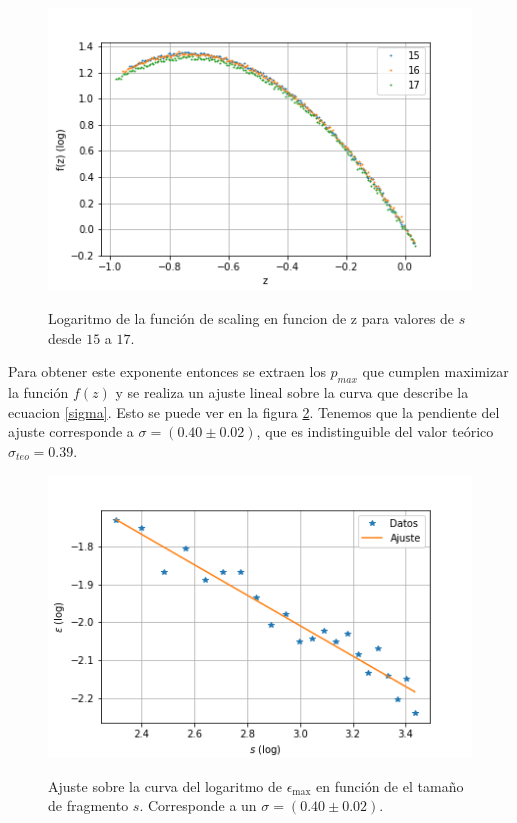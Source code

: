 \documentclass[
 reprint,
 amsmath,amssymb,
 aps,
]{revtex4-1}
\begin{document}
\begin{figure}[ht]
\begin{center}
\includegraphics[scale=0.62]{../images/f_vs_z.png} \\
\caption{Logaritmo de la funci\'on de scaling en funcion de z para valores de $s$ desde $15$ a $17$.}\label{f_vs_z}
\end{center}
\end{figure}

Para obtener este exponente entonces se extraen los $p_{max}$ que cumplen maximizar la funci\'on $f(z)$ y se realiza un ajuste lineal sobre la curva que describe la ecuacion \ref{sigma}. Esto se puede ver en la figura \ref{eps_vs_s_ajuste}. Tenemos que la pendiente del ajuste corresponde a $\sigma = (0.40 \pm 0.02)$, que es indistinguible del valor te\'orico $\sigma_{teo} = 0.39$.

\begin{figure}[ht]
\begin{center}
\includegraphics[scale=0.62]{../images/eps_vs_s_ajuste.png} \\
\caption{Ajuste sobre la curva del logaritmo de $\epsilon_\text{max}$ en funci\'on de el tama\~no de fragmento $s$. Corresponde a un $\sigma = (0.40 \pm 0.02)$.}\label{eps_vs_s_ajuste}
\end{center}
\end{figure}
\end{document}
